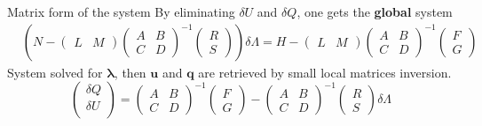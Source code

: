 \documentclass[24pt,t,table, aspectratio=169]{beamer}
\newcommand{\vecu}{\mathbf{u}}
\newcommand{\vecq}{\mathbf{q}}
\newcommand{\veclambda}{\boldsymbol{\lambda}}
\begin{document}
\begin{frame}{Matrix form of the system}
{
By eliminating $\delta U$ and $\delta Q$, one gets the \textbf{global} system
\begin{equation*}
    \begin{aligned}
    &\left(
    N -
    \begin{pmatrix}
        L & M
    \end{pmatrix}
    \begin{pmatrix}
        A & B\\
        C & D
    \end{pmatrix}^{-1}
    \begin{pmatrix}
        R\\
        S
    \end{pmatrix}
    \right)
    \delta \Lambda
    =
    H - 
    \begin{pmatrix}
        L & M
    \end{pmatrix}
    \begin{pmatrix}
        A & B\\
        C & D
    \end{pmatrix}^{-1}
    \begin{pmatrix}
        F\\
        G
    \end{pmatrix}
    \end{aligned}
\end{equation*}
System solved for $\veclambda$, then $\vecu$ and $\vecq$ are retrieved by small local matrices inversion.
\begin{equation*}
    \begin{pmatrix}
        \delta Q\\
        \delta U\\
    \end{pmatrix}
    =
    \begin{pmatrix}
        A & B\\
        C & D
    \end{pmatrix}^{-1}
    \begin{pmatrix}
        F\\
        G
    \end{pmatrix}
    -
    \begin{pmatrix}
        A & B\\
        C & D
    \end{pmatrix}^{-1}
    \begin{pmatrix}
        R\\
        S
    \end{pmatrix}
    \delta \Lambda
\end{equation*}
}
\end{frame}
\end{document}

